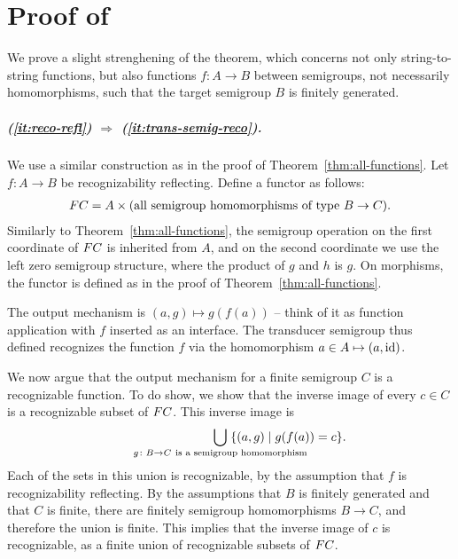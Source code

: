 \section{Proof of~}
    We prove a slight strenghening of the theorem, which concerns not only string-to-string functions, but also functions $f : A \to B$ between semigroups, not necessarily homomorphisms, such that the target semigroup $B$ is finitely generated.

    \subparagraph{(\ref{it:reco-refl}) $\Rightarrow$ (\ref{it:trans-semig-reco}).}  We  use a similar construction as in the proof of Theorem~\ref{thm:all-functions}. Let  $f :A \to B$  be recognizability reflecting.  Define  a functor as follows: 
    \begin{align*}
        \functor C = A \times \text{(all semigroup homomorphisms of type $B \to C$)}.
    \end{align*}
    Similarly to Theorem~\ref{thm:all-functions}, the semigroup operation on the first coordinate of $\functor C$ is inherited from $A$, and on the second coordinate we use the left zero semigroup structure,  where the product of $g$ and $h$ is $g$.     On morphisms, the functor is defined as in the proof of Theorem~\ref{thm:all-functions}. 

    The output mechanism  is $(a,g) \mapsto g(f(a))$ -- think of it as function application with $f$ inserted as an interface. The transducer semigroup thus defined recognizes the function $f$ via the homomorphism $a \in A  \mapsto  (a,\mathrm{id})$.
    
    We now argue that the output mechanism for a finite semigroup $C$ is a recognizable function.
     To do show, we show that the inverse image of every $c \in C$ is a  recognizable subset of $\functor C$. This inverse image is
    \begin{align*}
    \qquad\qquad\qquad\qquad \bigcup_{\mathclap{g\colon B \to C\ \text{is a semigroup homomorphism}}} \; \{(a,g) \mid g(f(a))=c \}.
    \end{align*}
    Each of the sets in this union is recognizable, by the assumption that $f$ is recognizability reflecting.     By the assumptions that $B$ is finitely generated and that $C$ is finite, there are finitely semigroup homomorphisms $B \to C$, and therefore the union is finite. This implies that the inverse image of $c$ is recognizable, as a finite union of recognizable subsets of  $\functor C$.
    
